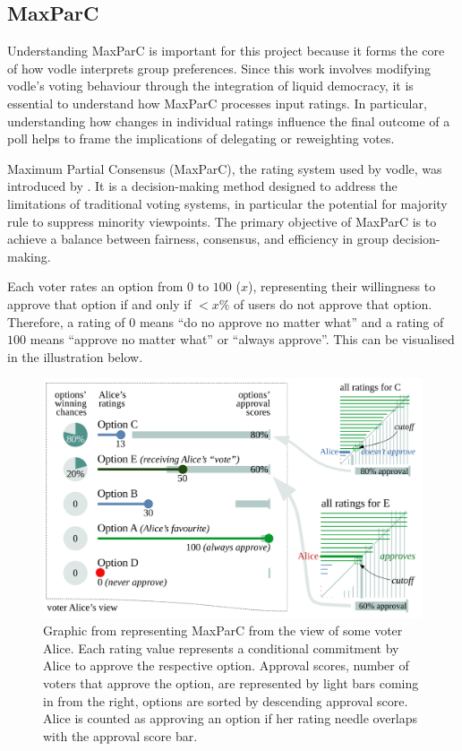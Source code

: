 \subsection{MaxParC}
Understanding MaxParC is important for this project because it forms the core of how vodle interprets group preferences. Since this work involves modifying vodle's voting behaviour through the integration of liquid democracy, it is essential to understand how MaxParC processes input ratings. In particular, understanding how changes in individual ratings influence the final outcome of a poll helps to frame the implications of delegating or reweighting votes.

Maximum Partial Consensus (MaxParC), the rating system used by vodle, was introduced by \cite{heitzig_fair_2024}. It is a decision-making method designed to address the limitations of traditional voting systems, in particular the potential for majority rule to suppress minority viewpoints.
The primary objective of MaxParC is to achieve a balance between fairness, consensus, and efficiency in group decision-making.

Each voter rates an option from $0$ to $100$ ($x$), representing their willingness to approve that option if and only if $<x\%$ of users do not approve that option. Therefore, a rating of $0$ means ``do no approve no matter what'' and a rating of $100$ means ``approve no matter what'' or ``always approve''. This can be visualised in the illustration below.

\begin{figure}[h!]
    \centering
    \includegraphics[width=0.8\linewidth]{../common/maxparc.png}
    \caption{Graphic from \cite{heitzig_fair_2024} representing MaxParC from the view of some voter Alice. Each rating value represents a conditional commitment by Alice to approve
    the respective option. Approval scores, number of voters that approve the option, are represented by light bars
    coming in from the right, options are sorted by descending approval score. Alice is counted as approving an option if her rating needle overlaps with
    the approval score bar.}
\end{figure}

